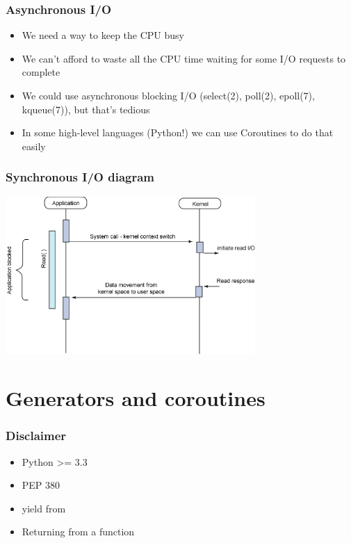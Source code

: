 \documentclass[ignorenonframetext,]{beamer}
\begin{document}
\begin{frame}[fragile]\frametitle{Asynchronous I/O}

\begin{itemize}[<+->]
\itemsep1pt\parskip0pt
\item
  We need a way to keep the CPU busy
\item
  We can't afford to waste all the CPU time waiting for some I/O
  requests to complete
\item
  We could use asynchronous blocking I/O (select(2), poll(2), epoll(7),
  kqueue(7)), but that's tedious
\item
  In some high-level languages (Python!) we can use Coroutines to do
  that easily
\end{itemize}

\end{frame}

\begin{frame}[fragile]\frametitle{Synchronous I/O diagram}

\begin{center}
 \includegraphics[height=6cm]{img/synchronous.png}
\end{center}

\end{frame}

\section{Generators and coroutines}

\begin{frame}[fragile]\frametitle{Disclaimer}

\begin{itemize}[<+->]
\itemsep1pt\parskip0pt
\item
  Python \textgreater{}= 3.3
\item
  PEP 380
\item
  yield from
\item
  Returning from a function
\end{itemize}

\end{frame}
\end{document}
